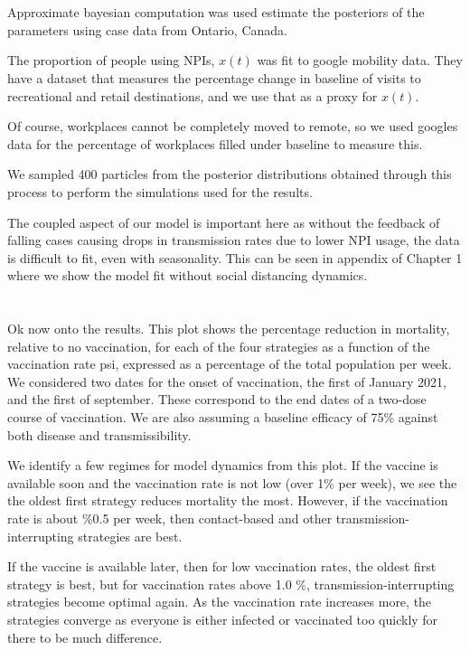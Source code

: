 \documentclass{article}
\begin{document}
\section{}
Approximate bayesian computation was used estimate the posteriors of the parameters using case data from Ontario, Canada.

The proportion of people using NPIs, $x(t)$ was fit to google mobility data. They have a dataset that measures the percentage change in baseline of visits to recreational and retail destinations, and we use that as a proxy for $x(t)$.

Of course, workplaces cannot be completely moved to remote, so we used googles data for the percentage of workplaces filled under baseline to measure this.

We sampled 400 particles from the posterior distributions obtained through this process to perform the simulations used for the results.  

The coupled aspect of our model is important here as without the feedback of falling cases causing drops in transmission rates due to lower NPI usage, the data is difficult to fit, even with seasonality. This can be seen in appendix of Chapter 1 where we show the model fit without social distancing dynamics. 

\section{}


Ok now onto the results. This plot shows the percentage reduction in mortality, relative to no vaccination, for each of the four strategies as a function of the vaccination rate psi, expressed as a percentage of the total population per week. We considered two dates for the onset of vaccination, the first of January 2021, and the first of september. These correspond to the end dates of a two-dose course of vaccination. We are also assuming a baseline efficacy of 75\% against both disease and transmissibility.

We identify a few regimes for model dynamics from this plot. If the vaccine is available soon and the vaccination rate is not low (over 1\% per week), we see the the oldest first strategy reduces mortality the most. However, if the vaccination rate is about \%0.5 per week, then contact-based and other transmission-interrupting strategies are best.

If the vaccine is available later, then for low vaccination rates, the oldest first strategy is best, but for vaccination rates above 1.0   \%, transmission-interrupting strategies become optimal again. As the vaccination rate increases more, the strategies converge as everyone is either infected or vaccinated too quickly for there to be much difference.
\end{document}
